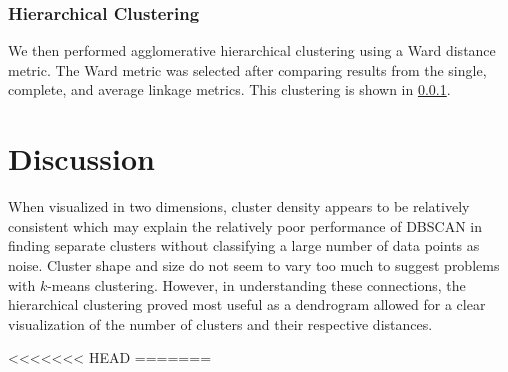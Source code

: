 \documentclass{article}
\begin{document}
\subsubsection{Hierarchical Clustering}
We then performed agglomerative hierarchical clustering using a Ward distance metric. The Ward metric was selected after comparing results from the single, complete, and average linkage metrics. This clustering is shown in \ref{}.

\section{Discussion}
\label{Discussion}
When visualized in two dimensions, cluster density appears to be relatively consistent which may explain the relatively poor performance of DBSCAN in finding separate clusters without classifying a large number of data points as noise. Cluster shape and size do not seem to vary too much to suggest problems with $k$-means clustering. However, in understanding these connections, the hierarchical clustering proved most useful as a dendrogram allowed for a clear visualization of the number of clusters and their respective distances.






<<<<<<< HEAD
=======
	
	
\end{document}
